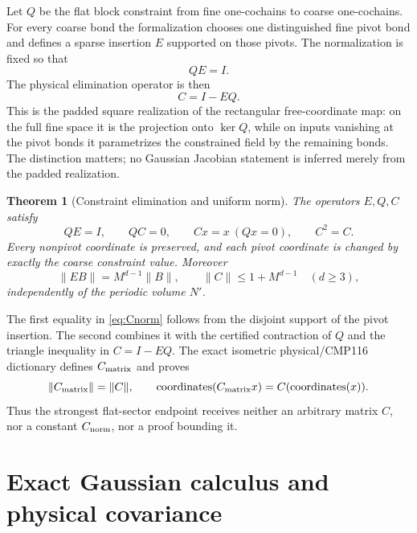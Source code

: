 \documentclass[11pt,a4paper]{article}
\newtheorem{theorem}{Theorem}[section]
\theoremstyle{definition}
\begin{document}
Let $Q$ be the flat block constraint from fine one-cochains to coarse
one-cochains.  For every coarse bond the formalization chooses one
distinguished fine pivot bond and defines a sparse insertion $E$ supported on
those pivots.  The normalization is fixed so that
\begin{equation}\label{eq:rightinverse}
 QE=I.
\end{equation}
The physical elimination operator is then
\begin{equation}\label{eq:Cdef}
 C=I-EQ.
\end{equation}
This is the padded square realization of the rectangular free-coordinate map:
on the full fine space it is the projection onto $\ker Q$, while on inputs
vanishing at the pivot bonds it parametrizes the constrained field by the
remaining bonds.  The distinction matters; no Gaussian Jacobian statement is
inferred merely from the padded realization.

\begin{theorem}[Constraint elimination and uniform norm]
\label{thm:constraint}
The operators $E,Q,C$ satisfy
\[
 QE=I,\qquad QC=0,\qquad
 Cx=x\ (Qx=0),\qquad C^2=C.
\]
Every nonpivot coordinate is preserved, and each pivot coordinate is changed
by exactly the coarse constraint value.  Moreover
\begin{equation}\label{eq:Cnorm}
 \lVert EB\rVert=M^{d-1}\lVert B\rVert,
 \qquad
 \lVert C\rVert\le 1+M^{d-1}\quad(d\ge3),
\end{equation}
independently of the periodic volume $N'$.
\end{theorem}

The first equality in \eqref{eq:Cnorm} follows from the disjoint support of
the pivot insertion.  The second combines it with the certified contraction
of $Q$ and the triangle inequality in $C=I-EQ$.  The exact isometric
physical/CMP116 dictionary defines $C_{\rm matrix}$ and proves
\begin{equation}\label{eq:Ctransport}
 \lVert C_{\rm matrix}\rVert=\lVert C\rVert,
 \qquad
 \operatorname{coordinates}(C_{\rm matrix}x)
   =C(\operatorname{coordinates}(x)).
\end{equation}
Thus the strongest flat-sector endpoint receives neither an arbitrary matrix
$C$, nor a constant $C_{\rm norm}$, nor a proof bounding it.

\section{Exact Gaussian calculus and physical covariance}
\end{document}
